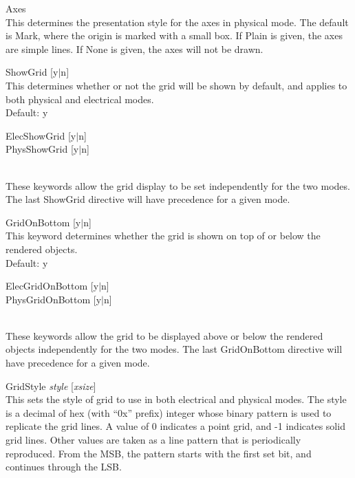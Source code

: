 \begin{description}
\item{\vt Axes} {}\\
This determines the presentation style for the axes in physical mode. 
The default is {\vt Mark}, where the origin is marked with a small
box.  If {\vt Plain} is given, the axes are simple lines.  If {\vt
None} is given, the axes will not be drawn.

\item{\vt ShowGrid} [{\vt y}$|${\vt n}]\\
This determines whether or not the grid will be shown by default, and
applies to both physical and electrical modes.\\
Default: {\vt y}

\item\parbox[b]{4in}{
{\vt ElecShowGrid} [{\vt y}$|${\vt n}]\\
{\vt PhysShowGrid} [{\vt y}$|${\vt n}]}\\
These keywords allow the grid display to be set independently for the
two modes.  The last {\vt ShowGrid} directive will have precedence for a
given mode.

\item{\vt GridOnBottom} [{\vt y}$|${\vt n}]\\
This keyword determines whether the grid is shown on top of or below
the rendered objects.\\
Default: {\vt y}

\item\parbox[b]{4in}{
{\vt ElecGridOnBottom} [{\vt y}$|${\vt n}]\\
{\vt PhysGridOnBottom} [{\vt y}$|${\vt n}]}\\
These keywords allow the grid to be displayed above or below the
rendered objects independently for the two modes.  The last {\vt
GridOnBottom} directive will have precedence for a given mode.

\item{\vt GridStyle} {\it style} [{\it xsize\/}]\\
This sets the style of grid to use in both electrical and physical
modes.  The style is a decimal of hex (with ``{\vt 0x}'' prefix)
integer whose binary pattern is used to replicate the grid lines.  A
value of 0 indicates a point grid, and -1 indicates solid grid lines. 
Other values are taken as a line pattern that is periodically
reproduced.  From the MSB, the pattern starts with the first set bit,
and continues through the LSB.


\end{description}
